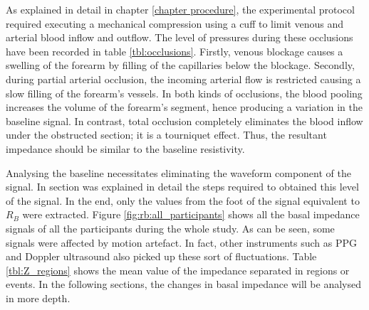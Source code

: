 
As explained in detail in chapter \ref{chapter procedure}, the experimental protocol required executing a mechanical compression using a cuff to limit venous and arterial blood inflow and outflow. The level of pressures during these occlusions have been recorded in table \ref{tbl:occlusions}. Firstly, venous blockage causes a swelling of the forearm by filling of the capillaries below the blockage. Secondly, during partial arterial occlusion, the incoming arterial flow is restricted causing a slow filling of the forearm's vessels. In both kinds of occlusions, the blood pooling increases the volume of the forearm's segment, hence producing a variation in the baseline signal. In contrast, total occlusion completely eliminates the blood inflow under the obstructed section; it is a tourniquet effect. Thus, the resultant impedance should be similar to the baseline resistivity.

Analysing the baseline necessitates eliminating the waveform component of the signal. In section  was explained in detail the steps required to obtained this level of the signal. In the end, only the values from the foot of the signal equivalent to $R_B$ were extracted. Figure \ref{fig:rb:all_participants} shows all the basal impedance signals of all the participants during the whole study. As can be seen, some signals were affected by motion artefact. In fact, other instruments such as PPG and Doppler ultrasound also picked up these sort of fluctuations. Table \ref{tbl:Z_regions} shows the mean value of the impedance separated in regions or events. In the following sections, the changes in basal impedance will be analysed in more depth. 

